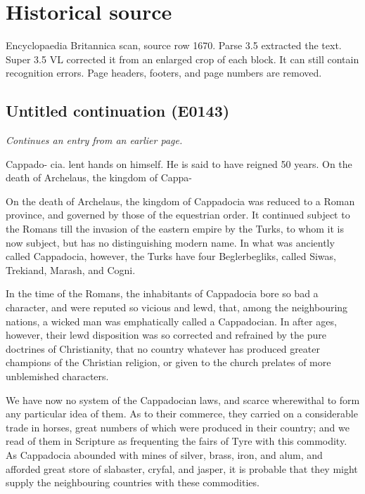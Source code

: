\documentclass{article}
\begin{document}
\section*{Historical source}
Encyclopaedia Britannica scan, source row 1670. Parse 3.5 extracted the text. Super 3.5 VL corrected it from an enlarged crop of each block. It can still contain recognition errors.
Page headers, footers, and page numbers are removed.

\subsection*{Untitled continuation (E0143)}
\textit{Continues an entry from an earlier page.}

Cappado-
cia. lent hands on himself. He is said to have reigned 50
years.
On the death of Archelaus, the kingdom of Cappa-

On the death of Archelaus, the kingdom of Cappadocia was reduced to a Roman province, and governed by those of the equestrian order. It continued subject to the Romans till the invasion of the eastern empire by the Turks, to whom it is now subject, but has no distinguishing modern name. In what was anciently called Cappadocia, however, the Turks have four Beglerbegliks, called Siwas, Trekiand, Marash, and Cogni.

In the time of the Romans, the inhabitants of Cappadocia bore so bad a character, and were reputed so vicious and lewd, that, among the neighbouring nations, a wicked man was emphatically called a Cappadocian. In after ages, however, their lewd disposition was so corrected and refrained by the pure doctrines of Christianity, that no country whatever has produced greater champions of the Christian religion, or given to the church prelates of more unblemished characters.

We have now no system of the Cappadocian laws, and scarce wherewithal to form any particular idea of them. As to their commerce, they carried on a considerable trade in horses, great numbers of which were produced in their country; and we read of them in Scripture as frequenting the fairs of Tyre with this commodity. As Cappadocia abounded with mines of silver, brass, iron, and alum, and afforded great store of slabaster, cryfal, and jasper, it is probable that they might supply the neighbouring countries with these commodities.
\end{document}
